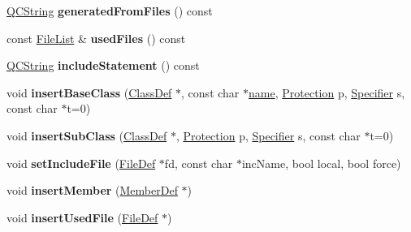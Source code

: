 \begin{DoxyCompactItemize}
\item 
\hypertarget{class_class_def_a374129cf2856a7f42c95fb4c256e8e7d}{\hyperlink{class_q_c_string}{Q\-C\-String} {\bfseries generated\-From\-Files} () const }\label{class_class_def_a374129cf2856a7f42c95fb4c256e8e7d}

\item 
\hypertarget{class_class_def_a1590bde288fb079fc006f0e17b929332}{const \hyperlink{class_file_list}{File\-List} \& {\bfseries used\-Files} () const }\label{class_class_def_a1590bde288fb079fc006f0e17b929332}

\item 
\hypertarget{class_class_def_a297d8007cbc86485068414c78e3d625f}{\hyperlink{class_q_c_string}{Q\-C\-String} {\bfseries include\-Statement} () const }\label{class_class_def_a297d8007cbc86485068414c78e3d625f}

\item 
\hypertarget{class_class_def_a1e60384ae1b4e7337f79b85863e7ee20}{void {\bfseries insert\-Base\-Class} (\hyperlink{class_class_def}{Class\-Def} $\ast$, const char $\ast$\hyperlink{class_definition_a2c310e06c9aadc6fb218f80fcbb5c695}{name}, \hyperlink{types_8h_a90e352184df58cd09455fe9996cd4ded}{Protection} p, \hyperlink{types_8h_ab16236bdd10ddf4d73a9847350f0017e}{Specifier} s, const char $\ast$t=0)}\label{class_class_def_a1e60384ae1b4e7337f79b85863e7ee20}

\item 
\hypertarget{class_class_def_ac2ad6c1787a5b9b7c493b2d391dc0bac}{void {\bfseries insert\-Sub\-Class} (\hyperlink{class_class_def}{Class\-Def} $\ast$, \hyperlink{types_8h_a90e352184df58cd09455fe9996cd4ded}{Protection} p, \hyperlink{types_8h_ab16236bdd10ddf4d73a9847350f0017e}{Specifier} s, const char $\ast$t=0)}\label{class_class_def_ac2ad6c1787a5b9b7c493b2d391dc0bac}

\item 
\hypertarget{class_class_def_ab9db640805241ec8533233a1aaf8f3b7}{void {\bfseries set\-Include\-File} (\hyperlink{class_file_def}{File\-Def} $\ast$fd, const char $\ast$inc\-Name, bool local, bool force)}\label{class_class_def_ab9db640805241ec8533233a1aaf8f3b7}

\item 
\hypertarget{class_class_def_a873393a406532d65fd5014d07276bbc5}{void {\bfseries insert\-Member} (\hyperlink{class_member_def}{Member\-Def} $\ast$)}\label{class_class_def_a873393a406532d65fd5014d07276bbc5}

\item 
\hypertarget{class_class_def_a00c010c1921cf58a26c39133ed3ef8b3}{void {\bfseries insert\-Used\-File} (\hyperlink{class_file_def}{File\-Def} $\ast$)}\label{class_class_def_a00c010c1921cf58a26c39133ed3ef8b3}


\end{DoxyCompactItemize}
